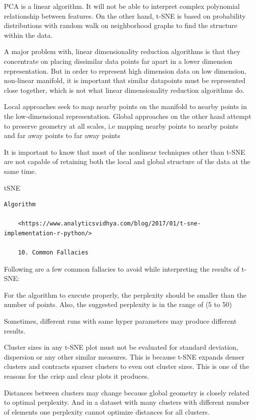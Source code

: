 \documentclass[
]{book}
\begin{document}
PCA is a linear algorithm. It will not be able to interpret complex polynomial relationship between features. On the other hand, t-SNE is based on probability distributions with random walk on neighborhood graphs to find the structure within the data.

A major problem with, linear dimensionality reduction algorithms is that they concentrate on placing dissimilar data points far apart in a lower dimension representation. But in order to represent high dimension data on low dimension, non-linear manifold, it is important that similar datapoints must be represented close together, which is not what linear dimensionality reduction algorithms do.

Local approaches seek to map nearby points on the manifold to nearby points in the low-dimensional representation. Global approaches on the other hand attempt to preserve geometry at all scales, i.e mapping nearby points to nearby points and far away points to far away points

It is important to know that most of the nonlinear techniques other than t-SNE are not capable of retaining both the local and global structure of the data at the same time.

tSNE

\begin{verbatim}
Algorithm

    <https://www.analyticsvidhya.com/blog/2017/01/t-sne-implementation-r-python/>

    10. Common Fallacies
\end{verbatim}

Following are a few common fallacies to avoid while interpreting the results of t-SNE:

For the algorithm to execute properly, the perplexity should be smaller than the number of points. Also, the suggested perplexity is in the range of (5 to 50)

Sometimes, different runs with same hyper parameters may produce different results.

Cluster sizes in any t-SNE plot must not be evaluated for standard deviation, dispersion or any other similar measures. This is because t-SNE expands denser clusters and contracts sparser clusters to even out cluster sizes. This is one of the reasons for the crisp and clear plots it produces.

Distances between clusters may change because global geometry is closely related to optimal perplexity. And in a dataset with many clusters with different number of elements one perplexity cannot optimize distances for all clusters.
\end{document}
